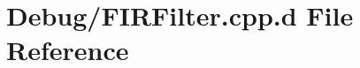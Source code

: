 \hypertarget{_debug_2_f_i_r_filter_8cpp_8d}{\section{\-Debug/\-F\-I\-R\-Filter.cpp.\-d \-File \-Reference}
\label{_debug_2_f_i_r_filter_8cpp_8d}
}

